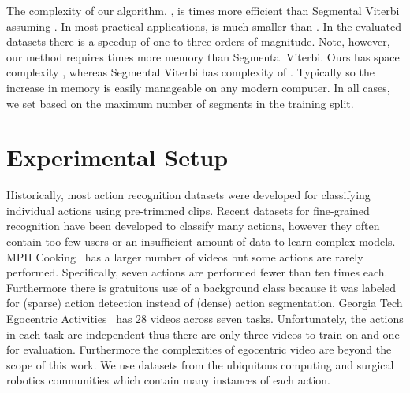\documentclass[runningheads]{llncs}
\begin{document}
The complexity of our algorithm, , is  times more efficient than Segmental Viterbi assuming . 
In most practical applications,  is much smaller than . In the evaluated datasets there is a speedup of one to three orders of magnitude.
Note, however, our method requires  times more memory than Segmental Viterbi. Ours has space complexity , whereas Segmental Viterbi has complexity of . Typically  so the increase in memory is easily manageable on any modern computer. 
In all cases, we set  based on the maximum number of segments in the training split. 








































 \section{Experimental Setup}
\label{sec:evaluation}

Historically, most action recognition datasets were developed for classifying individual actions using pre-trimmed clips. 
Recent datasets for fine-grained recognition have been developed to classify many actions, however they often contain too few users or an insufficient amount of data to learn complex models. 
MPII Cooking~\cite{rohrbach_ijcv_2015} has a larger number of videos but some actions are rarely performed.
Specifically, seven actions are performed fewer than ten times each. Furthermore there is gratuitous use of a background class because it was labeled for (sparse) action detection instead of (dense) action segmentation.
Georgia Tech Egocentric Activities~\cite{fathi_iccv_2011} has 28 videos across seven tasks. Unfortunately, the actions in each task are independent thus there are only three videos to train on and one for evaluation. 
Furthermore the complexities of egocentric video are beyond the scope of this work.
We use datasets from the ubiquitous computing and surgical robotics communities which contain many instances of each action. 
\end{document}
